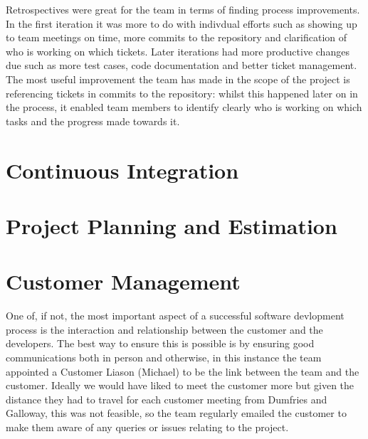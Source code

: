 \documentclass{l3proj}
\begin{document}
Retrospectives were great for the team in terms of finding process improvements. In the first iteration it was more to
do with indivdual efforts such as showing up to team meetings on time, more commits to the repository and clarification
of who is working on which tickets. Later iterations had more productive changes due such as more test cases, code
documentation and better ticket management. The most useful improvement the team has made in the scope of the project
is referencing tickets in commits to the repository: whilst this happened later on in the process, it enabled team members
to identify clearly who is working on which tasks and the progress made towards it.


\section{Continuous Integration}
\label{sec:continuous-integration}




\section{Project Planning and Estimation}
\label{sec:planning}




\section{Customer Management}
\label{sec:customer-management}


One of, if not, the most important aspect of a successful software devlopment process is the interaction and relationship
between the customer and the developers. The best way to ensure this is possible is by ensuring good communications
both in person and otherwise, in this instance the team appointed a Customer Liason (Michael) to be the link between the
team and the customer. Ideally we would have liked to meet the customer more but given the distance they had to travel
for each customer meeting from Dumfries and Galloway, this was not feasible, so the team regularly emailed the customer
to make them aware of any queries or issues relating to the project.
\end{document}
